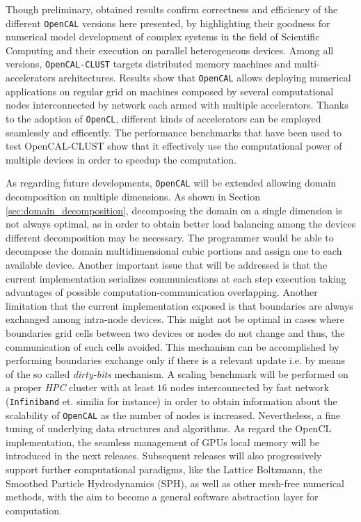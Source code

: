 Though preliminary, obtained results confirm correctness and
efficiency of the different \texttt{OpenCAL} versions here presented, by
highlighting their goodness for numerical model development of
complex systems in the field of Scientific Computing and their
execution on parallel heterogeneous devices.
Among all versions,  \texttt{OpenCAL-CLUST} targets distributed memory machines and multi-accelerators architectures.
Results show that \texttt{OpenCAL} allows deploying numerical applications on regular grid on machines composed by several computational nodes interconnected by network each armed with multiple accelerators. Thanks to the adoption of \texttt{OpenCL}, different kinds of accelerators can be employed seamlessly and efficently.
The performance benchmarks that have been used to test OpenCAL-CLUST show that it effectively use the computational power of multiple devices in order to speedup the computation.

As regarding future developments, \texttt{OpenCAL} will be  extended allowing domain decomposition on multiple dimensions. As shown in Section \ref{sec:domain_decomposition}, decomposing the domain on a single dimension is not always optimal, as in order to obtain better load balancing among the devices different decomposition may be necessary.
The programmer would be able to decompose the domain multidimensional cubic portions and assign one to each available device.
Another important issue that will be addressed is that the current implementation serializes communications at each step execution taking advantages of possible computation-communication overlapping.
Another limitation that the current implementation exposed is that boundaries are always exchanged among intra-node devices. This might not be optimal in cases where boundaries grid cells between two devices or nodes do not change and thus, the communication of such cells avoided. This mechanism can be accomplished by performing boundaries exchange only if there is a relevant update i.e. by means of the so called \textit{dirty-bits} mechanism. 
A scaling benchmark will be performed on a proper \textit{HPC} cluster with at least $16$ nodes interconnected by fast network (\texttt{Infiniband} et. similia for instance) in order to obtain information about the scalability of \texttt{OpenCAL} as the number of nodes is increased.
Nevertheless, a fine tuning of underlying data structures and
algorithms. As regard the OpenCL implementation, the seamless management of GPUs local memory will be introduced in the next releases.
Subsequent releases will also progressively support further computational
paradigms, like the Lattice Boltzmann, the Smoothed Particle
Hydrodynamics (SPH), as well as other mesh-free numerical methods,
with the aim to become a general software abstraction layer for
computation.

